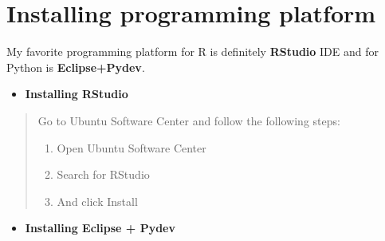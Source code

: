 \documentclass[letterpaper,11pt,english]{sphinxmanual}
\begin{document}

\section{Installing programming platform}
\label{gettingstarted:index-1}\label{gettingstarted:installing-programming-platform}
My favorite programming platform for R is definitely \textbf{RStudio} IDE and for Python is  \textbf{Eclipse+Pydev}.
\begin{itemize}
\item {} 
\textbf{Installing RStudio}

\end{itemize}
\begin{quote}

Go to Ubuntu Software Center and follow the following steps:
\begin{enumerate}
\item {} 
Open Ubuntu Software Center

\item {} 
Search for RStudio

\item {} 
And click Install

\end{enumerate}
\end{quote}
\begin{itemize}
\item {} 
\textbf{Installing Eclipse + Pydev}

\end{itemize}
\end{document}
